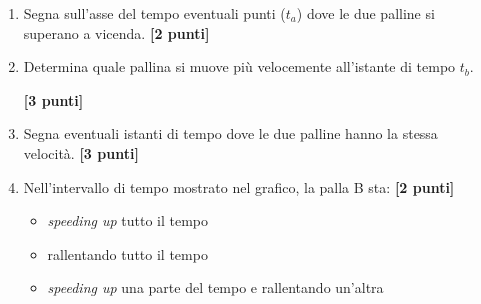\documentclass{report} \usepackage[T1]{fontenc} \usepackage[italian]{babel}
\begin{document}
\begin{enumerate}
\item Segna sull’asse del tempo eventuali punti ($t_a$) dove le due palline si\\
superano a vicenda. \hfill  \textbf{[2 punti]}
\item Determina quale pallina si muove più velocemente all’istante di tempo $t_b$.

\hfill \textbf{[3 punti]}
\item Segna eventuali istanti di tempo dove le due palline hanno la stessa\\
velocità. \hfill \textbf{[3 punti]}
\item Nell’intervallo di tempo mostrato nel grafico, la palla B sta: \hfill \textbf{[2 punti]}
\begin{itemize}
\item \emph{speeding up} tutto il tempo
\item rallentando tutto il tempo
\item \emph{speeding up} una parte del tempo e rallentando un’altra
\end{itemize}
\end{enumerate}



\nocite{trowbridge1980investigation}
\nocite{bernardini2012thinking}

{}

\end{document}
